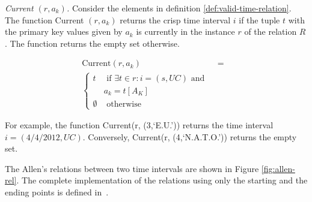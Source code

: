 \begin{definition}
\label{def:current-in-relation}
\emph{Current $\left(r,a_k \right)$.}
Consider the elements in definition \ref{def:valid-time-relation}. The function Current $\left(r,a_k \right)$ returns the crisp time interval $i$ if the tuple $t$ with the primary key values given by $a_k$ is currently in the instance $r$ of the relation $R$. The function returns the empty set otherwise.
% 


\begin{align}
\label{eq:current-in-relation}
\mbox{Current} \left(r, a_k\right) &=& \\ 
\begin{cases}
\nonumber
t & \mbox{ if } \exists t \in r : i = \left(s, UC \right) \mbox{ and }\\
& a_k = t[A_K] \\
\emptyset & \mbox{ otherwise}
\end{cases}
\end{align}
\end{definition}

For example, the function Current(r, (3,`E.U.')) returns the time interval $i = \left(4/4/2012 , UC  \right)$. Conversely, Current(r, (4,`N.A.T.O.')) returns the empty set.


The Allen's relations between two time intervals are shown in Figure \ref{fig:allen-rel}. The complete implementation of the relations using only the starting and the ending points is defined in~\cite{Nagypal2003}.

